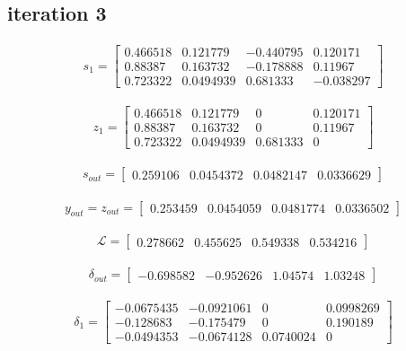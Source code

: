 \documentclass[a4paper]{article}
\begin{document}
\subsection{iteration 3}

\begin{gather}s_1 = \begin{bmatrix} 0.466518 & 0.121779 & -0.440795 & 0.120171 \\ 0.88387 & 0.163732 & -0.178888 & 0.11967 \\ 0.723322 & 0.0494939 & 0.681333 & -0.038297 \end{bmatrix}\nonumber \end{gather} 

\begin{gather}z_1 = \begin{bmatrix} 0.466518 & 0.121779 & 0 & 0.120171 \\ 0.88387 & 0.163732 & 0 & 0.11967 \\ 0.723322 & 0.0494939 & 0.681333 & 0 \end{bmatrix}\nonumber \end{gather}

\begin{gather}s_{out} = \begin{bmatrix} 0.259106 &	0.0454372 &	0.0482147 &	0.0336629
\end{bmatrix}\nonumber \end{gather}

\begin{gather}y_{out} = z_{out} = \begin{bmatrix} 0.253459 & 0.0454059 &	0.0481774 &	0.0336502
\end{bmatrix}\nonumber \end{gather}

\begin{gather}\mathcal{L} = \begin{bmatrix} 0.278662 &	0.455625 &	0.549338 &	0.534216
 \end{bmatrix}\nonumber \end{gather}

\begin{gather}\delta_{out} = \begin{bmatrix} -0.698582 & -0.952626 & 1.04574 & 1.03248
\end{bmatrix}\nonumber \end{gather}

\begin{gather}\delta_1 = \begin{bmatrix} -0.0675435 & -0.0921061 & 0 &	0.0998269 \\ -0.128683 &	-0.175479 &	0 &	0.190189 \\ -0.0494353 &	-0.0674128 &	0.0740024 &	0 \end{bmatrix}\nonumber \end{gather}
\end{document}
